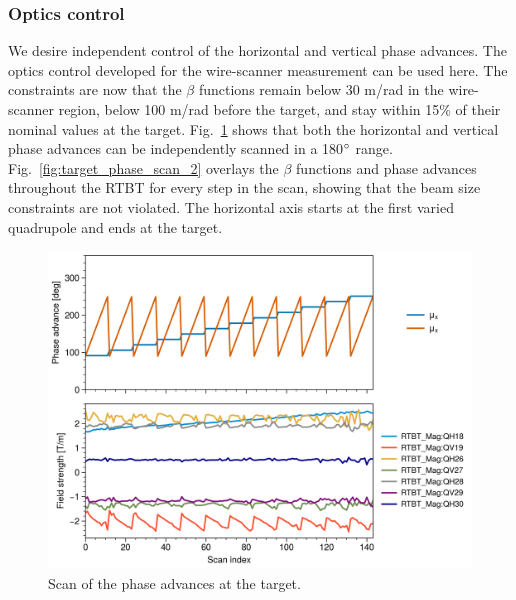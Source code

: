 \subsubsection{Optics control}

We desire independent control of the horizontal and vertical phase advances. The optics control developed for the wire-scanner measurement can be used here. The constraints are now that the $\beta$ functions remain below 30 m/rad in the wire-scanner region, below 100 m/rad before the target, and stay within 15\% of their nominal values at the target. Fig.~\ref{fig:target_phase_scan_1} shows that both the horizontal and vertical phase advances can be independently scanned in a 180$\degree$ range. Fig.~\ref{fig:target_phase_scan_2} overlays the $\beta$ functions and phase advances throughout the RTBT for every step in the scan, showing that the beam size constraints are not violated. The horizontal axis starts at the first varied quadrupole and ends at the target.
%
\begin{figure}[!p]
    \centering
    \vspace*{2.0cm}
    \includegraphics[width=\textwidth]{Images/chapter4/target_phase_scan1.png}
    \caption{Scan of the phase advances at the target.}
     \label{fig:target_phase_scan_1}
    \vspace*{2.0cm}
\end{figure}
%
